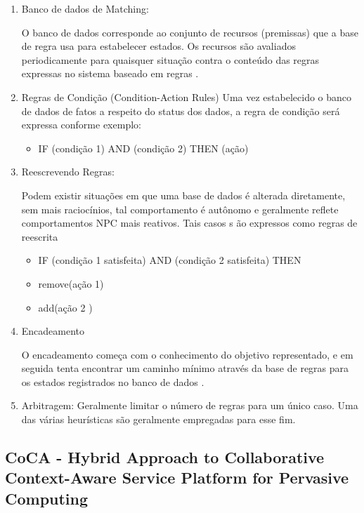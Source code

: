 \documentclass[12pt,a4paper,compsoc]{IEEEtran}
\begin{document}
\begin{enumerate}

\item Banco de dados de Matching: 

O banco de dados corresponde ao conjunto de recursos (premissas) que a base de regra usa para estabelecer estados. Os recursos são avaliados periodicamente para quaisquer situação contra o conteúdo das regras expressas no sistema baseado em regras .

\item Regras de Condição (Condition-Action Rules) Uma vez estabelecido o banco de dados de fatos a respeito do status dos dados, a regra de condição será expressa conforme exemplo:

\begin{itemize}
\item IF (condição 1) AND (condição 2) THEN (ação)
\end{itemize}

\item Reescrevendo Regras:

Podem existir situações em que uma base de dados é alterada diretamente, sem mais raciocínios, tal comportamento é autônomo e geralmente reflete comportamentos NPC mais reativos.
Tais casos s ão expressos como regras de reescrita 

\begin{itemize}
\item IF (condição 1 satisfeita) AND (condição 2 satisfeita) THEN 
\item remove(ação 1)
\item add(ação 2 )
\end{itemize}

\item Encadeamento 

O encadeamento  começa com o conhecimento do objetivo  representado, e em seguida tenta encontrar um caminho mínimo através da base de regras para os estados registrados no banco de dados .

 
\item Arbitragem: 
Geralmente limitar o número de regras para um único caso. Uma das várias heurísticas são geralmente empregadas para esse fim.

\end{enumerate}


\subsection{CoCA - Hybrid Approach to Collaborative Context-Aware Service Platform for Pervasive Computing}
\end{document}
